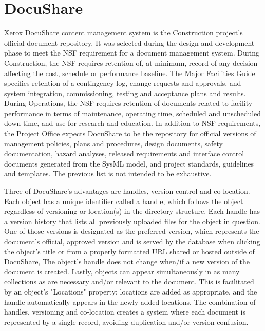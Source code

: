 \newpage
\section{DocuShare}

Xerox DocuShare content management system is the Construction project's official document repository. It was selected during the design and development phase to meet the NSF requirement for a document management system. During Construction, the NSF requires retention of, at minimum, record of any decision affecting the cost, schedule or performance baseline. The Major Facilities Guide specifies retention of a contingency log, change requests and approvals, and system integration, commissioning, testing and acceptance plans and results. During Operations, the NSF requires retention of documents related to facility performance in terms of maintenance, operating time, scheduled and unscheduled down time, and use for research and education. In addition to NSF requirements, the Project Office expects DocuShare to be the repository for official versions of management policies, plans and procedures, design documents, safety documentation, hazard analyses, released requirements and interface control documents generated from the SysML model, and project standards, guidelines and templates. The previous list is not intended to be exhaustive.

Three of DocuShare's advantages are handles, version control and co-location. Each object has a unique identifier called a handle, which follows the object regardless of versioning or location(s) in the directory structure. Each handle has a version history that lists all previously uploaded files for the object in question. One of those versions is designated as the preferred version, which represents the document's official, approved version and is served by the database when clicking the object's title or from a properly formatted URL shared or hosted outside of DocuShare, The object's handle does not change when/if a new version of the document is created. Lastly, objects can appear simultaneously in as many collections as are necessary and/or relevant to the document. This is facilitated by an object's "Locations" property; locations are added as appropriate, and the handle automatically appears in the newly added locations. The combination of handles, versioning and co-location creates a system where each document is represented by a single record, avoiding duplication and/or version confusion.

